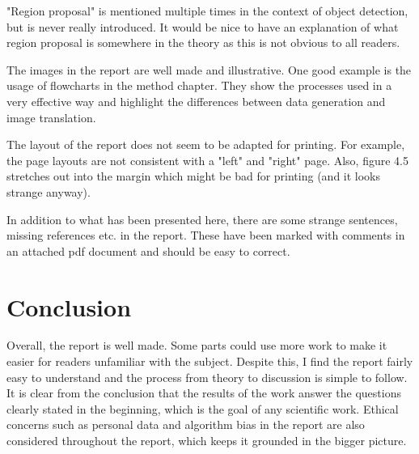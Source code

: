 \documentclass[11pt,a4paper]{article}
\begin{document}
	"Region proposal" is mentioned multiple times in the context of object detection, but is never really introduced. It would be nice to have an explanation of what region proposal is somewhere in the theory as this is not obvious to all readers.
	
	The images in the report are well made and illustrative. One good example is the usage of flowcharts in the method chapter. They show the processes used in a very effective way and highlight the differences between data generation and image translation.
	
	The layout of the report does not seem to be adapted for printing. For example, the page layouts are not consistent with a "left" and "right" page. Also, figure 4.5 stretches out into the margin which might be bad for printing (and it looks strange anyway).
	
	In addition to what has been presented here, there are some strange sentences, missing references etc. in the report. These have been marked with comments in an attached pdf document and should be easy to correct.
	
	\section*{Conclusion}
	Overall, the report is well made. Some parts could use more work to make it easier for readers unfamiliar with the subject. Despite this, I find the report fairly easy to understand and the process from theory to discussion is simple to follow. It is clear from the conclusion that the results of the work answer the questions clearly stated in the beginning, which is the goal of any scientific work. Ethical concerns such as personal data and algorithm bias in the report are also considered throughout the report, which keeps it grounded in the bigger picture.
	
\end{document}
